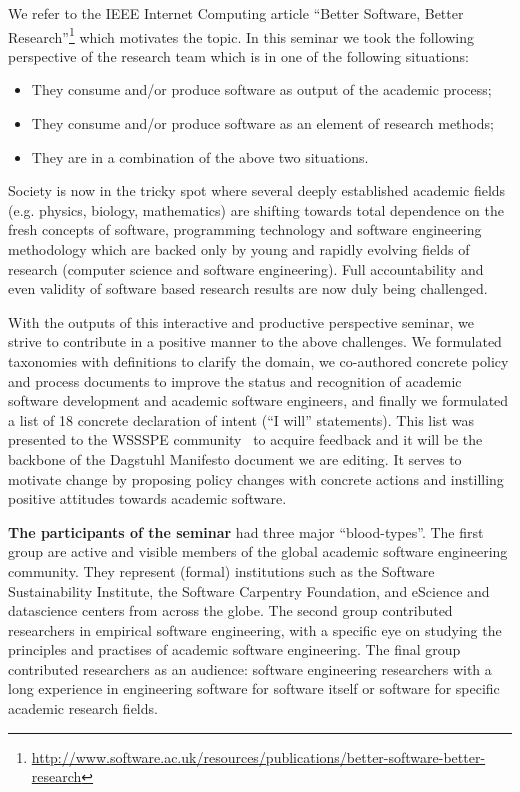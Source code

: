 \documentclass[a4paper,UKenglish]{dagrep}
\begin{document}
We refer to the IEEE Internet Computing article ``Better Software, Better Research''\footnote{\url{http://www.software.ac.uk/resources/publications/better-software-better-research}} which motivates the topic. In this seminar we took the following perspective of the research team which is in one of the following situations:
\begin{itemize}
\item They consume and/or produce software as output of the academic process;
\item They consume and/or produce software as an element of research methods;
\item They are in a combination of the above two situations.
\end{itemize}

Society is now in the tricky spot where several deeply established academic fields
(e.g. physics, biology, mathematics) are shifting towards total dependence on the fresh concepts of software, programming technology and software engineering methodology
which are backed only by young and rapidly evolving fields of research (computer science and software engineering).  Full accountability and even validity of software based research results are now duly being challenged.

With the outputs of this interactive and productive perspective seminar, we strive to contribute in a positive manner to the above challenges. We formulated taxonomies with definitions to clarify the domain, we co-authored concrete policy and process documents to improve the status and recognition of academic software development and academic software engineers, and finally we formulated a list of 18 concrete declaration of intent (``I will'' statements). This list was presented to the WSSSPE community~\cite{wssspe} to acquire feedback and it will be the backbone of the Dagstuhl Manifesto document we are editing. It serves to motivate change by  proposing policy changes with concrete actions and instilling positive attitudes towards academic software.


\textbf{The participants of the seminar} had three major ``blood-types''. The first group are active and visible members of the global academic software engineering community. They represent (formal) institutions such as the Software Sustainability Institute, the Software Carpentry Foundation, and eScience and datascience centers from across the globe. The second group contributed researchers in empirical software engineering, with a specific eye on studying the principles and practises of academic software engineering. The final group contributed researchers as an audience: software engineering researchers with a long experience in engineering software for software itself or software for specific academic research fields.
\end{document}
